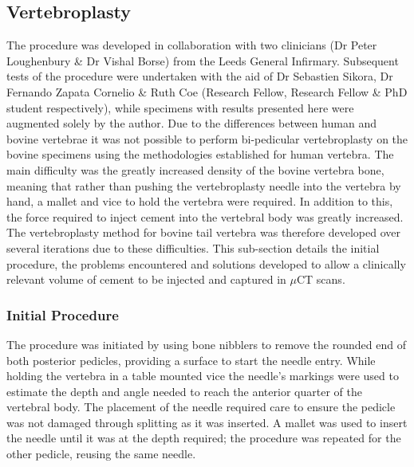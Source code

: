 \subsection{Vertebroplasty }\label{vertebroplasty-bov} The procedure was
developed in collaboration with two clinicians (Dr Peter Loughenbury \& Dr
Vishal Borse) from the Leeds General Infirmary. Subsequent tests of the
procedure were undertaken with the aid of Dr Sebastien Sikora, Dr Fernando
Zapata Cornelio \& Ruth Coe (Research Fellow, Research Fellow \& PhD student
respectively), while specimens with results presented here were augmented
solely by the author.  Due to the differences between human and bovine
vertebrae it was not possible to perform bi-pedicular vertebroplasty on the
bovine specimens using the methodologies established for human vertebra.  The
main difficulty was the greatly increased density of the bovine vertebra bone,
meaning that rather than pushing the vertebroplasty needle into the vertebra by
hand, a mallet and vice to hold the vertebra were required. In addition to
this, the force required to inject cement into the vertebral body was greatly
increased.  The vertebroplasty method for bovine tail vertebra was therefore
developed over several iterations due to these difficulties. This sub-section
details the initial procedure, the problems encountered and solutions developed
to allow a clinically relevant volume of cement to be injected and captured in
$\mu$CT scans.

\subsubsection{Initial Procedure}

The procedure was initiated by using bone nibblers to remove the rounded end of
both posterior pedicles, providing a surface to start the needle entry. While
holding the vertebra in a table mounted vice the needle's markings were used to
estimate the depth and angle needed to reach the anterior quarter of the
vertebral body. The placement of the needle required care to ensure the pedicle
was not damaged through splitting as it was inserted. A mallet was used to
insert the needle until it was at the depth required; the procedure was
repeated for the other pedicle, reusing the same needle.



